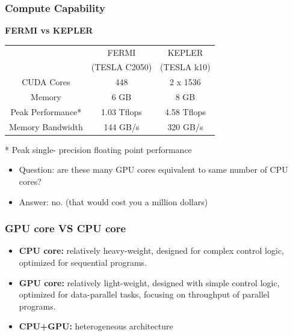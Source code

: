\documentclass[xcolor={x11names,svgnames,dvipsnames}]{beamer}
\begin{document}
\begin{frame}
\frametitle{Compute Capability}
\textbf{FERMI vs KEPLER}
\begin{center}
\begin{tabular}{|c|c|c|}
\hline  & FERMI  & KEPLER\\ 
  & (TESLA C2050)  & (TESLA k10)\\ 
\hline  CUDA Cores& 448  & 2 x 1536\\ 
\hline  Memory & 6 GB  & 8 GB\\ 
\hline  Peak Performance* & 1.03 Tflops  & 4.58 Tflops\\ 
\hline  Memory Bandwidth & 144 GB/s  & 320 GB/s\\ 
\hline
\end{tabular}
\end{center}
* Peak single- precision floating point performance 

\begin{itemize}
\item Question: are these many GPU cores equivalent to same
number of CPU cores?
\item Answer: no. (that would cost you a million dollars)
\end{itemize}

\end{frame}

\begin{frame}
\frametitle{GPU core VS CPU core}
\begin{itemize}
\item
\textbf{CPU core:} relatively heavy-weight, designed for complex
control logic, optimized for sequential programs.

\item
\textbf{GPU core:} relatively light-weight, designed with simple
control logic, optimized for data-parallel tasks, focusing on
throughput of parallel programs.

\item 
\textbf{CPU+GPU:} heterogeneous architecture
\end{itemize}

\end{frame}
\end{document}
